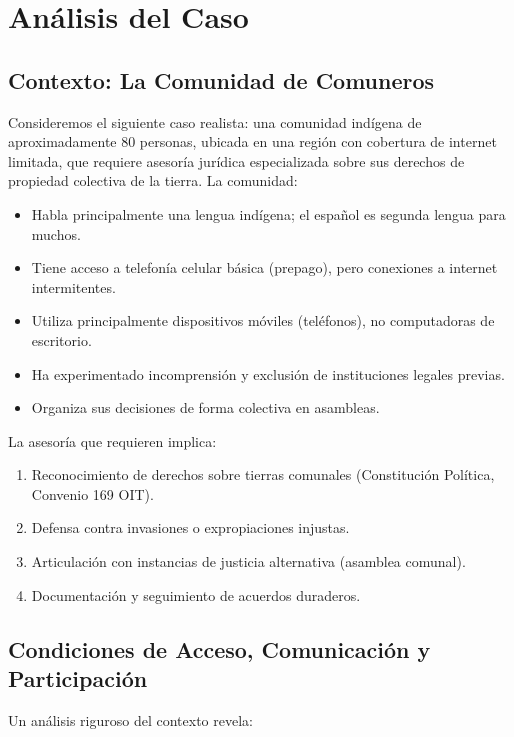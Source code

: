 ﻿\documentclass[
  spanish,
  letterpaper, oneside
]{article}
\begin{document}
\section{Análisis del Caso}

\subsection{Contexto: La Comunidad de Comuneros}

Consideremos el siguiente caso realista: una comunidad indígena de aproximadamente 80 personas, 
ubicada en una región con cobertura de internet limitada, que requiere asesoría jurídica especializada 
sobre sus derechos de propiedad colectiva de la tierra. La comunidad:

\begin{itemize}
  \item Habla principalmente una lengua indígena; el español es segunda lengua para muchos.
  \item Tiene acceso a telefonía celular básica (prepago), pero conexiones a internet intermitentes.
  \item Utiliza principalmente dispositivos móviles (teléfonos), no computadoras de escritorio.
  \item Ha experimentado incomprensión y exclusión de instituciones legales previas.
  \item Organiza sus decisiones de forma colectiva en asambleas.
\end{itemize}

La asesoría que requieren implica:

\begin{enumerate}
  \item Reconocimiento de derechos sobre tierras comunales (Constitución Política, Convenio 169 OIT).
  \item Defensa contra invasiones o expropiaciones injustas.
  \item Articulación con instancias de justicia alternativa (asamblea comunal).
  \item Documentación y seguimiento de acuerdos duraderos.
\end{enumerate}

\subsection{Condiciones de Acceso, Comunicación y Participación}

Un análisis riguroso del contexto revela:
\end{document}
